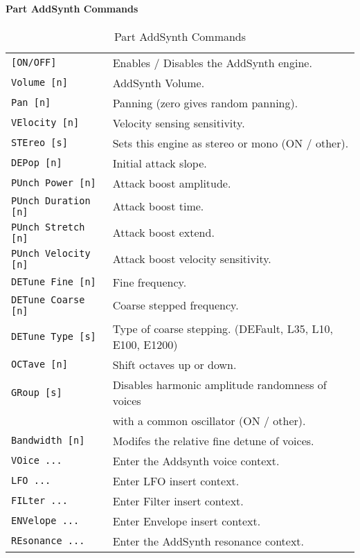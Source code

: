 \paragraph{Part AddSynth Commands}
\label{paragraph:command_line_part_addsynth_commands}
   \begin{table}[H]
      \centering
      \caption{Part AddSynth Commands}
      \label{table:yoshimi_part_addsynth_commands}
      \begin{tabular}{l l}
\texttt{[ON/OFF]} &
   Enables / Disables the AddSynth engine. \\
\texttt{Volume [n]} &
   AddSynth Volume.  \\
\texttt{Pan [n]} &
   Panning (zero gives random panning).\\
\texttt{VElocity [n]} &
   Velocity sensing sensitivity. \\
\texttt{STEreo [s]} &
   Sets this engine as stereo or mono (ON / other). \\
\texttt{DEPop [n]} &
   Initial attack slope.   \\
\texttt{PUnch Power [n]} &
   Attack boost amplitude. \\
\texttt{PUnch Duration [n]} &
   Attack boost time.   \\
\texttt{PUnch Stretch [n]} &
   Attack boost extend. \\
\texttt{PUnch Velocity [n]} &
   Attack boost velocity sensitivity.  \\
\texttt{DETune Fine [n]} &
   Fine frequency.   \\
\texttt{DETune Coarse [n]} &
   Coarse stepped frequency.  \\
\texttt{DETune Type [s]} &
   Type of coarse stepping. (DEFault, L35, L10, E100, E1200)  \\
\texttt{OCTave [n]} &
   Shift octaves up or down.  \\
\texttt{GRoup [s]} &
   Disables harmonic amplitude randomness of voices \\
\texttt{ } &
             with a common oscillator (ON / other). \\
\texttt{Bandwidth [n]} &
   Modifes the relative fine detune of voices. \\
\texttt{VOice ...} &
   Enter the Addsynth voice context. \\
\texttt{LFO ...} &
   Enter LFO insert context.  \\
\texttt{FILter ...} &
   Enter Filter insert context.  \\
\texttt{ENVelope ...} &
   Enter Envelope insert context.   \\
\texttt{REsonance ...} &
   Enter the AddSynth resonance context. \\
      \end{tabular}
   \end{table}

